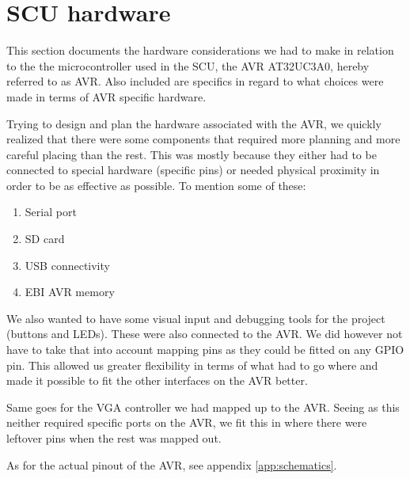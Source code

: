 \section{SCU hardware}

This section documents the hardware considerations we had to make in relation
to the the microcontroller used in the SCU, the AVR AT32UC3A0, hereby referred
to as AVR. Also included are specifics in regard to what choices were made in
terms of AVR specific hardware. 

Trying to design and plan the hardware associated with the AVR, we quickly
realized that there were some components that required more planning and more
careful placing than the rest. This was mostly because they either had to be
connected to special hardware (specific pins) or needed physical proximity in
order to be as effective as possible. To mention some of these: 

\begin{enumerate}
\item Serial port
\item \ac{SD} card
\item \ac{USB} connectivity
\item \ac{EBI} AVR memory
\end{enumerate}

We also wanted to have some visual input and debugging tools for the project
(buttons and LEDs). These were also connected to the AVR. We did however not
have to take that into account mapping pins as they could be fitted on any
\ac{GPIO} pin. This allowed us greater flexibility in terms of what had to go
where and made it possible to fit the other interfaces on the AVR better.

Same goes for the \ac{VGA} controller we had mapped up to the AVR. Seeing
as this neither required specific ports on the AVR, we fit this in where
there were leftover pins when the rest was mapped out.

As for the actual pinout of the AVR, see appendix \ref{app:schematics}.

